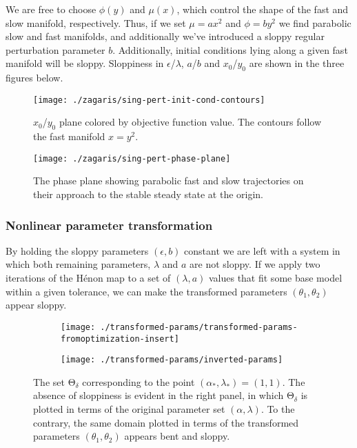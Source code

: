 \documentclass[11pt]{article}
\newcommand{\ps}{\mathrm{\Theta}}
\newcommand{\p}{\theta}
\begin{document}
We are free to choose $\phi(y)$ and $\mu(x)$, which control the shape of the fast and slow manifold, respectively. Thus, if we set $\mu = a x^2$ and $\phi = b y^2$ we find parabolic slow and fast manifolds, and additionally we've introduced a sloppy regular perturbation parameter $b$. Additionally, initial conditions lying along a given fast manifold will be sloppy. Sloppiness in $\epsilon$/$\lambda$, $a$/$b$ and $x_0$/$y_0$ are shown in the three figures below.

\begin{figure}[htbp]
  \centering
  \texttt{[image: ./zagaris/sing-pert-init-cond-contours]}
  \caption{$x_0$/$y_0$ plane colored by objective function value. The contours follow the fast manifold $x=y^2$.}
\end{figure}

\begin{figure}[htbp]
  \centering
  \texttt{[image: ./zagaris/sing-pert-phase-plane]}
  \caption{The phase plane showing parabolic fast and slow
    trajectories on their approach to the stable steady state at the origin.}
\end{figure}


\subsubsection{Nonlinear parameter transformation}

By holding the sloppy parameters $(\epsilon, b)$ constant we are left
with a system in which both remaining parameters, $\lambda$ and $a$
are not sloppy. If we apply two iterations of the H\'{e}non map to a
set of $(\lambda, a)$ values that fit some base model within a given
tolerance, we can make the transformed parameters $(\theta_1,
\theta_2)$ appear sloppy.

\begin{figure}[ht!]
  \begin{subfigure}[t]{0.49\textwidth}
    \centering
    \texttt{[image: ./transformed-params/transformed-params-fromoptimization-insert]}
  \end{subfigure}
  \begin{subfigure}[t]{0.49\textwidth}
    \centering
    \texttt{[image: ./transformed-params/inverted-params]}
  \end{subfigure} %
  \caption{The set $\ps_\delta$ corresponding to the point
    $(\alpha_*,\lambda_*) = (1,1)$. The absence of
    sloppiness is evident in the right panel, in which $\ps_\delta$ is
    plotted in terms of the original parameter set
    $(\alpha,\lambda)$. To the contrary, the same domain plotted in
    terms of the transformed parameters $(\p_1,\p_2)$ appears bent and
    sloppy. \label{f.transf-params}}
\end{figure}
\end{document}
